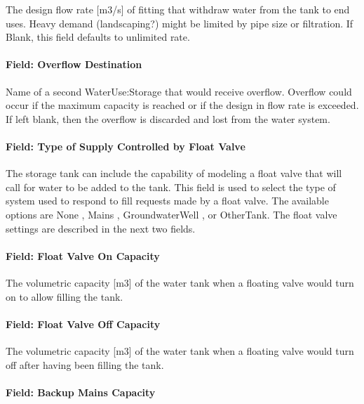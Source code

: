 The design flow rate {[}m3/s{]} of fitting that withdraw water from the tank to end uses. Heavy demand (landscaping?) might be limited by pipe size or filtration. If Blank, this field defaults to unlimited rate.

\paragraph{Field: Overflow Destination}\label{field-overflow-destination}

Name of a second WaterUse:Storage that would receive overflow. Overflow could occur if the maximum capacity is reached or if the design in flow rate is exceeded. If left blank, then the overflow is discarded and lost from the water system.

\paragraph{Field: Type of Supply Controlled by Float Valve}\label{field-type-of-supply-controlled-by-float-valve}

The storage tank can include the capability of modeling a float valve that will call for water to be added to the tank. This field is used to select the type of system used to respond to fill requests made by a float valve. The available options are None , Mains , GroundwaterWell , or OtherTank. The float valve settings are described in the next two fields.

\paragraph{Field: Float Valve On Capacity}\label{field-float-valve-on-capacity}

The volumetric capacity {[}m3{]} of the water tank when a floating valve would turn on to allow filling the tank.

\paragraph{Field: Float Valve Off Capacity}\label{field-float-valve-off-capacity}

The volumetric capacity {[}m3{]} of the water tank when a floating valve would turn off after having been filling the tank.

\paragraph{Field: Backup Mains Capacity}\label{field-backup-mains-capacity}

